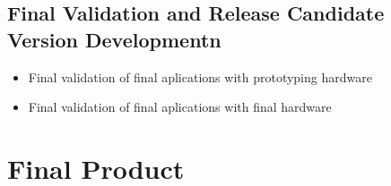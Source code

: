 		\subsection{Final Validation and Release Candidate Version Developmentn}
		\label{ssec:Final.Validation}	
		\begin{itemize}
		\item Final validation of final aplications with prototyping hardware
		\item Final validation of final aplications with final hardware
		\end{itemize}
		

		\section{Final Product}
